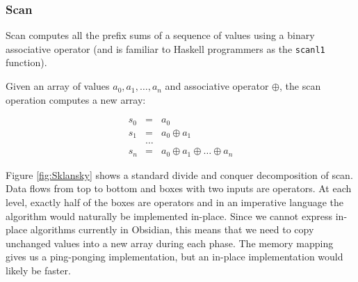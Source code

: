 





\subsubsection{Scan} 

Scan computes all the prefix sums of a sequence of values using 
a binary associative operator (and is familiar to Haskell
programmers as the {\tt scanl1} function).

Given an array of values $a_0,a_1,\ldots,a_n$ and associative operator $\oplus$,
the scan operation computes a new array: 

\begin{equation*} 
  \begin{array} {rcl} 
    s_0 & = & a_0 \\
    s_1 & = & a_0 \oplus a_1 \\ 
    & \ldots & \\
    s_n & = & a_0 \oplus a_1 \oplus \ldots \oplus a_n
  \end{array}
\end{equation*} 



Figure \ref{fig:Sklansky}
shows a standard divide and conquer decomposition of scan. Data
flows from top to bottom and boxes with two inputs are
operators. At each level, exactly half of the boxes are operators
and in an imperative language the algorithm would naturally be implemented
in-place.
Since we cannot express in-place algorithms 
currently in Obsidian, this means that we need to copy unchanged values into a new array 
during each phase. The memory mapping gives us a ping-ponging implementation, but an in-place implementation would likely be faster.

